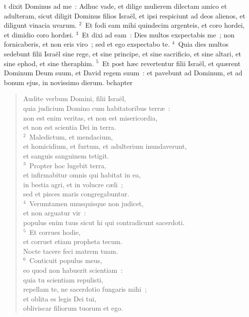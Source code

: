 \bchapter
{}t dixit Dominus ad me~: Adhuc vade, et dilige mulierem dilectam amico et adulteram, sicut diligit Dominus filios Isra\"el, et ipsi respiciunt ad deos alienos, et diligunt vinacia uvarum.
${}^{2}$~Et fodi eam mihi quindecim argenteis, et coro hordei, et dimidio coro hord\ae i.
${}^{3}$~Et dixi ad eam~: Dies multos exspectabis me~; non fornicaberis, et non eris viro~; sed et ego exspectabo te.
${}^{4}$~Quia dies multos sedebunt filii Isra\"el sine rege, et sine principe, et sine sacrificio, et sine altari, et sine ephod, et sine theraphim.
${}^{5}$~Et post h\ae c revertentur filii Isra\"el, et qu\ae rent Dominum Deum suum, et David regem suum~: et pavebunt ad Dominum, et ad bonum ejus, in novissimo dierum.
bchapter\begin{verse}\vspace{-19pt}Audite verbum Domini, filii Isra\"el,\\ quia judicium Domino cum habitatoribus terr\ae~:\\ non est enim veritas, et non est misericordia,\\ et non est scientia Dei in terra.\\
${}^{2}$~Maledictum, et mendacium,\\ et homicidium, et furtum, et adulterium inundaverunt,\\ et sanguis sanguinem tetigit.\\
${}^{3}$~Propter hoc lugebit terra,\\ et infirmabitur omnis qui habitat in ea,\\ in bestia agri, et in volucre c\ae li~;\\ sed et pisces maris congregabuntur.\\
${}^{4}$~Verumtamen unusquisque non judicet,\\ et non arguatur vir~:\\ populus enim tuus sicut hi qui contradicunt sacerdoti.\\
${}^{5}$~Et corrues hodie,\\ et corruet etiam propheta tecum.\\ Nocte tacere feci matrem tuam.\\
${}^{6}$~Conticuit populus meus,\\ eo quod non habuerit scientiam~:\\ quia tu scientiam repulisti,\\ repellam te, ne sacerdotio fungaris mihi~;\\ et oblita es legis Dei tui,\\ obliviscar filiorum tuorum et ego.\\

\end{verse}
